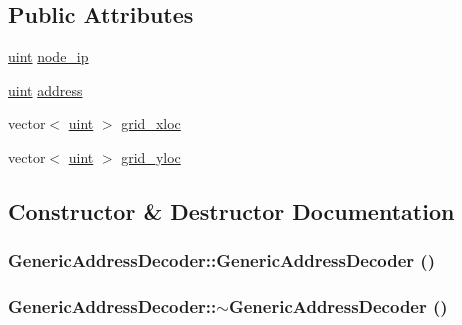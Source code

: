 \subsection*{Public Attributes}
\begin{CompactItemize}
\item 
\hyperlink{outputBuffer_8h_91ad9478d81a7aaf2593e8d9c3d06a14}{uint} \hyperlink{classGenericAddressDecoder_9b8fd8a1cc36e6ab4b398b2a9a4f74bd}{node\_\-ip}
\item 
\hyperlink{outputBuffer_8h_91ad9478d81a7aaf2593e8d9c3d06a14}{uint} \hyperlink{classGenericAddressDecoder_e4958f1eabb1f538cbfa4f49a70819ee}{address}
\item 
vector$<$ \hyperlink{outputBuffer_8h_91ad9478d81a7aaf2593e8d9c3d06a14}{uint} $>$ \hyperlink{classGenericAddressDecoder_7b34be1b61592aa81a59122776d35d0a}{grid\_\-xloc}
\item 
vector$<$ \hyperlink{outputBuffer_8h_91ad9478d81a7aaf2593e8d9c3d06a14}{uint} $>$ \hyperlink{classGenericAddressDecoder_1ba45f3ca9054494e325c9ab49b61da8}{grid\_\-yloc}
\end{CompactItemize}


\subsection{Constructor \& Destructor Documentation}
\hypertarget{classGenericAddressDecoder_c9f3d12b792ee1821499d4e332b52690}{
\subsubsection[{GenericAddressDecoder}]{\setlength{\rightskip}{0pt plus 5cm}GenericAddressDecoder::GenericAddressDecoder ()}}
\label{classGenericAddressDecoder_c9f3d12b792ee1821499d4e332b52690}


\hypertarget{classGenericAddressDecoder_9d20e3a126b7aa5ec9865ee6a4e1a6eb}{
\subsubsection[{$\sim$GenericAddressDecoder}]{\setlength{\rightskip}{0pt plus 5cm}GenericAddressDecoder::$\sim$GenericAddressDecoder ()}}
\label{classGenericAddressDecoder_9d20e3a126b7aa5ec9865ee6a4e1a6eb}




